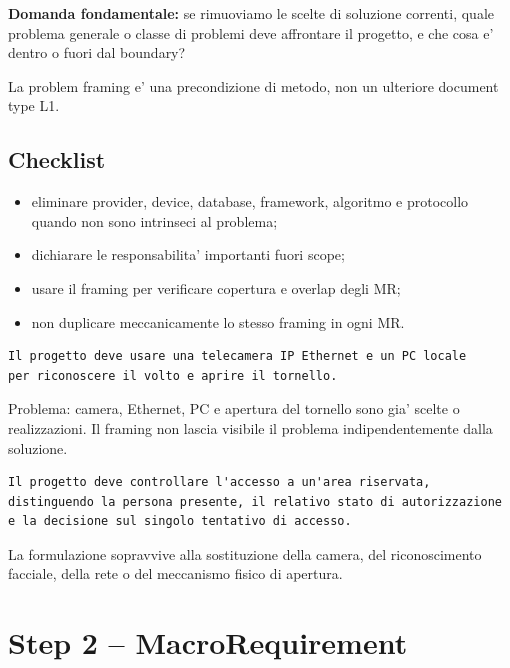 \documentclass[11pt,a4paper]{article}
\begin{document}
\begin{statusclosed}
\textbf{Domanda fondamentale:} se rimuoviamo le scelte di soluzione correnti, quale problema generale o classe di problemi deve affrontare il progetto, e che cosa e' dentro o fuori dal boundary?
\end{statusclosed}

La problem framing e' una precondizione di metodo, non un ulteriore document type L1.

\subsection{Checklist}

\begin{itemize}
\item eliminare provider, device, database, framework, algoritmo e protocollo quando non sono intrinseci al problema;
\item dichiarare le responsabilita' importanti fuori scope;
\item usare il framing per verificare copertura e overlap degli MR;
\item non duplicare meccanicamente lo stesso framing in ogni MR.
\end{itemize}

\begin{badbox}
\begin{lstlisting}
Il progetto deve usare una telecamera IP Ethernet e un PC locale
per riconoscere il volto e aprire il tornello.
\end{lstlisting}
Problema: camera, Ethernet, PC e apertura del tornello sono gia' scelte o realizzazioni. Il framing non lascia visibile il problema indipendentemente dalla soluzione.
\end{badbox}

\begin{goodbox}
\begin{lstlisting}
Il progetto deve controllare l'accesso a un'area riservata,
distinguendo la persona presente, il relativo stato di autorizzazione
e la decisione sul singolo tentativo di accesso.
\end{lstlisting}
La formulazione sopravvive alla sostituzione della camera, del riconoscimento facciale, della rete o del meccanismo fisico di apertura.
\end{goodbox}

\section{Step 2 -- MacroRequirement}
\end{document}
